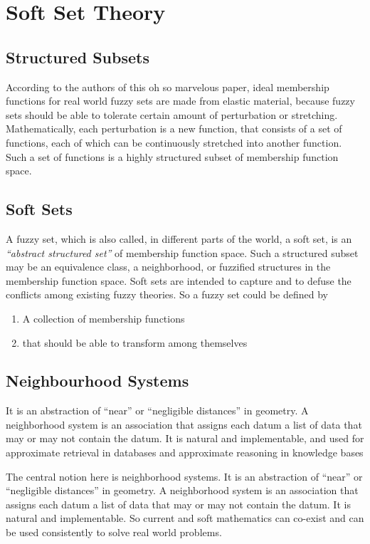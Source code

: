 \documentclass[12pt]{article} %
\begin{document}
\section{Soft Set Theory}

\subsection{Structured Subsets}
According to the authors of this oh so marvelous paper, ideal membership functions for real world fuzzy sets are made from elastic material, because fuzzy sets should be able to tolerate certain
amount of perturbation or stretching. Mathematically, each perturbation is a new function, that consists of a set of functions,
each of which can be continuously stretched into
another function. Such a set of functions is a highly
structured subset of membership function space. 

\subsection{Soft Sets}
A fuzzy set, which is also called, in different parts of the world, a soft set, is an \textit{“abstract structured set”} of
membership function space. Such a structured subset
may be an equivalence class, a neighborhood, or
fuzzified structures in the membership function space. Soft sets are intended to capture and to defuse the conflicts among existing fuzzy theories. So a fuzzy set could be defined by 
\begin{enumerate}
\item{A collection of membership functions}
\item{that should be able to transform among themselves}
\end{enumerate}


\subsection{Neighbourhood Systems}
It is an abstraction of “near” or “negligible distances” in
geometry. A neighborhood system is an association that
assigns each datum a list of data that may or may not
contain the datum. It is natural and implementable, and used for  approximate retrieval in databases and approximate reasoning in knowledge bases

The central notion here is neighborhood systems. It
is an abstraction of “near” or “negligible distances” in
geometry. A neighborhood system is an association that
assigns each datum a list of data that may or may not
contain the datum. It is natural and implementable. So current and soft mathematics can
co-exist and can be used consistently to solve real
world problems.
\end{document}
